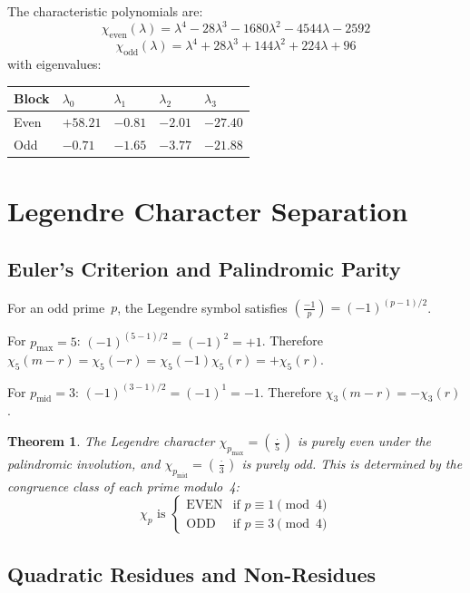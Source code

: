 \documentclass[11pt,letterpaper]{article}
\newtheorem{theorem}{Theorem}[section]
\theoremstyle{definition}
\begin{document}
The characteristic polynomials are:
\[
\chi_{\text{even}}(\lambda) = \lambda^4 - 28\lambda^3 - 1680\lambda^2 - 4544\lambda - 2592
\]
\[
\chi_{\text{odd}}(\lambda) = \lambda^4 + 28\lambda^3 + 144\lambda^2 + 224\lambda + 96
\]
with eigenvalues:

\begin{center}
\begin{tabular}{@{}lllll@{}}
\toprule
Block & $\lambda_0$ & $\lambda_1$ & $\lambda_2$ & $\lambda_3$ \\
\midrule
Even & $+58.21$ & $-0.81$ & $-2.01$ & $-27.40$ \\
Odd & $-0.71$ & $-1.65$ & $-3.77$ & $-21.88$ \\
\bottomrule
\end{tabular}
\end{center}


\section{Legendre Character Separation}

\subsection{Euler's Criterion and Palindromic Parity}

For an odd prime~$p$, the Legendre symbol satisfies $\left(\frac{-1}{p}\right) = (-1)^{(p-1)/2}$.

For $p_{\text{max}} = 5$: $(-1)^{(5-1)/2} = (-1)^2 = +1$. Therefore $\chi_5(m - r) = \chi_5(-r) = \chi_5(-1)\chi_5(r) = +\chi_5(r)$.

For $p_{\text{mid}} = 3$: $(-1)^{(3-1)/2} = (-1)^1 = -1$. Therefore $\chi_3(m - r) = -\chi_3(r)$.

\begin{theorem}
The Legendre character $\chi_{p_{\text{max}}} = \left(\frac{\cdot}{5}\right)$ is purely even under the palindromic involution, and $\chi_{p_{\text{mid}}} = \left(\frac{\cdot}{3}\right)$ is purely odd. This is determined by the congruence class of each prime modulo~4:
\[
\chi_p \text{ is }
\begin{cases}
\text{EVEN} & \text{if } p \equiv 1 \pmod{4} \\
\text{ODD}  & \text{if } p \equiv 3 \pmod{4}
\end{cases}
\]
\end{theorem}

\subsection{Quadratic Residues and Non-Residues}
\end{document}
